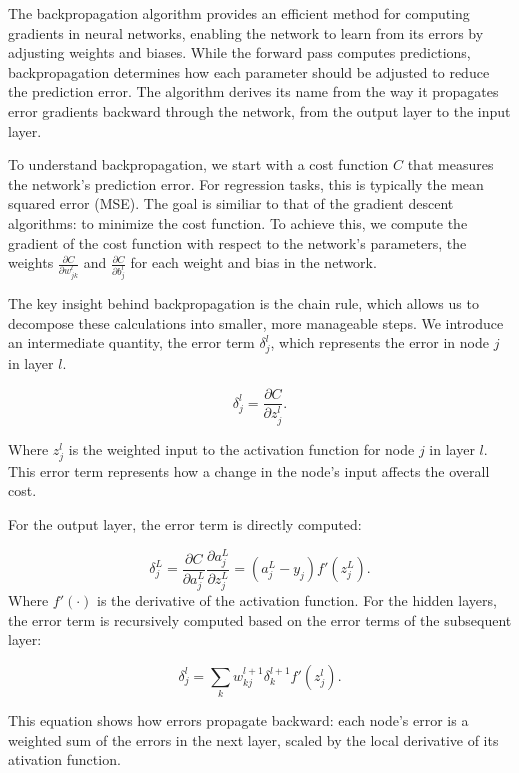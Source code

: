 \documentclass[aps,pra,english,notitlepage,reprint,nofootinbib]{revtex4-1}  %
\begin{document}
The backpropagation algorithm provides an efficient method for computing gradients in neural networks, enabling the network to learn from its errors by adjusting weights and biases. While the forward pass computes predictions, backpropagation determines how each parameter should be adjusted to reduce the prediction error. The algorithm derives its name from the way it propagates error gradients backward through the network, from the output layer to the input layer.

To understand backpropagation, we start with a cost function \( C \) that measures the network's prediction error. For regression tasks, this is typically the mean squared error (MSE). The goal is similiar to that of the gradient descent algorithms: to minimize the cost function. To achieve this, we compute the gradient of the cost function with respect to the network's parameters, the weights \( \frac{\partial C}{\partial w_{jk}^l} \) and \( \frac{\partial C}{\partial b_j^l} \) for each weight and bias in the network. 

The key insight behind backpropagation is the chain rule, which allows us to decompose these calculations into smaller, more manageable steps. We introduce an intermediate quantity, the error term \( \delta_j^l \), which represents the error in node \( j \) in layer \( l \).

\begin{equation}
    \delta_j^l = \frac{\partial C}{\partial z_j^l}.
\end{equation}
    

Where \( z_j^l \) is the weighted input to the activation function for node \( j \) in layer \( l \). This error term represents how a change in the node's input affects the overall cost.

For the output layer, the error term is directly computed:

\begin{equation}
    \delta_j^L = \frac{\partial C}{\partial a_j^L}\frac{\partial a_j^L}{\partial z_j^L} = (a_j^L - y_j)f'(z_j^L).
\end{equation}
Where \( f'(\cdot) \) is the derivative of the activation function. For the hidden layers, the error term is recursively computed based on the error terms of the subsequent layer:

\begin{equation}
    \delta_j^l = \sum_k w_{kj}^{l+1}\delta_k^{l+1}f'(z_j^l).
\end{equation}

This equation shows how errors propagate backward: each node's error is a weighted sum of the errors in the next layer, scaled by the local derivative of its ativation function.
\end{document}
